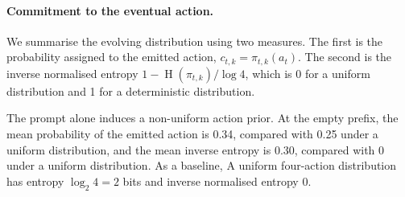 \documentclass{article}
\begin{document}



\paragraph{Commitment to the eventual action.}
We summarise the evolving distribution using two measures. 
The first is the probability assigned to the emitted action, $c_{t,k}=\pi_{t,k}(a_t)$. 
The second is the inverse normalised entropy $1-\operatorname{H}(\pi_{t,k})/\log 4$, which is 0 for a uniform distribution and 1 for a deterministic distribution.

The prompt alone induces a non-uniform action prior. 
At the empty prefix, the mean probability of the emitted action is 0.34, compared with 0.25 under a uniform distribution, and the mean inverse entropy is 0.30, compared with 0 under a uniform distribution.  As a baseline, A uniform four-action distribution has entropy $\log_2 4=2$ bits and inverse normalised entropy 0. 
\end{document}
